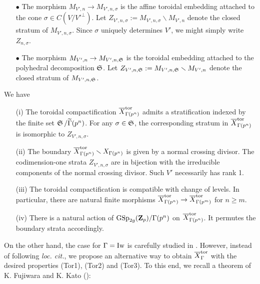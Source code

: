 \begin{enumerate}
\item[$\bullet$] The morphism $M_{V', n}\rightarrow M_{V', n, \sigma}$ is the affine toroidal embedding attached to the cone $\sigma\in C(V/V'^{\perp})$. Let $Z_{V', n, \sigma}:=M_{V', n, \sigma}\smallsetminus M_{V',n}$ denote the closed stratum of $M_{V', n, \sigma}$. Since $\sigma$ uniquely determines $V'$, we might simply write $Z_{n, \sigma}$.
    \item[$\bullet$] The morphism $M_{V', n}\rightarrow M_{V', n, \operatorname{\mathfrak{S}}}$ is the toroidal embedding attached to the polyhedral decomposition $\operatorname{\mathfrak{S}}$. Let $Z_{V', n, \operatorname{\mathfrak{S}}}:=M_{V', n, \operatorname{\mathfrak{S}}}\smallsetminus M_{V', n}$ denote the closed stratum of $M_{V', n, \operatorname{\mathfrak{S}}}$.
\end{enumerate} 

\begin{Theorem}
We have 
\begin{enumerate}
    \item[(i)] The toroidal compactification $\overline{X}_{\Gamma(p^n)}^{\operatorname{tor}}$ admits a stratification indexed by the finite set $\operatorname{\mathfrak{S}}/\widetilde{\Gamma}(p^n)$. For any $\sigma\in \operatorname{\mathfrak{S}}$, the corresponding stratum in $\overline{X}_{\Gamma(p^n)}^{\operatorname{tor}}$ is isomorphic to $Z_{V', n, \sigma}$.
    \item[(ii)] The boundary $\overline{X}_{\Gamma(p^n)}^{\operatorname{tor}}\smallsetminus X_{\Gamma(p^n)}$ is given by a normal crossing divisor. The codimension-one strata $Z_{V', n, \sigma}$ are in bijection with the irreducible components of the normal crossing divisor. Such $V'$ necessarily has rank 1.
    \item[(iii)] The toroidal compactification is compatible with change of levels. In particular, there are natural finite morphisms $\overline{X}_{\Gamma(p^n)}^{\operatorname{tor}}\rightarrow \overline{X}_{\Gamma(p^m)}^{\operatorname{tor}}$ for $n\geq m$. 
    \item[(iv)] There is a natural action of $\operatorname{GSp}_{2g}(\operatorname{\mathbf{Z}}_p)/\Gamma(p^n)$ on $\overline{X}_{\Gamma(p^n)}^{\operatorname{tor}}$. It permutes the boundary strata accordingly.
   \end{enumerate}
\end{Theorem}

On the other hand, the case for $\Gamma = \operatorname{Iw}$ is carefully studied in \cite{Stroh-TorComp}. However, instead of following \emph{loc. cit.}, we propose an alternative way to obtain $\overline{X}_{\Gamma}^{\operatorname{tor}}$ with the desired properties (Tor1), (Tor2) and (Tor3). To this end, we recall a theorem of K. Fujiwara and K. Kato (\cite[Theorem 7.6]{Illusie}):

